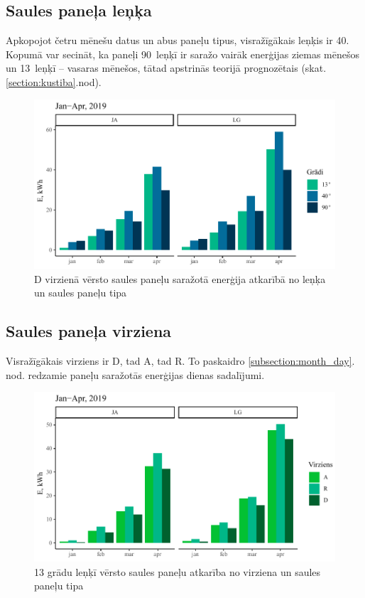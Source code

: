 \subsection{Saules paneļa leņķa}\label{subsection:degree}
Apkopojot četru mēnešu datus un abus paneļu tipus, visražīgākais leņķis ir 40\textdegree.
Kopumā var secināt, ka paneļi 90\textdegree ~leņķī ir saražo vairāk enerģijas ziemas mēnešos un 13\textdegree ~leņķī -- vasaras mēnešos, tātad apstrinās teorijā prognozētais (skat.\ref{section:kustiba}.nod).
\begin{figure}[h]
    \centering
    \includegraphics[width=\linewidth]{figures/results/all_degType.pdf}
    \caption{D virzienā vērsto saules paneļu saražotā enerģija atkarībā no leņķa un saules paneļu tipa} \label{fig:lg_ja_deg}
\end{figure}


\subsection{Saules paneļa virziena}\label{subsection:dir}
Visražīgākais virziens ir D, tad A, tad R. To paskaidro \ref{subsection:month_day}. nod. redzamie paneļu saražotās enerģijas dienas sadalījumi.
\begin{figure}[h]
    \centering
    \includegraphics[width=\linewidth]{figures/results/all_dirType.pdf}
    \caption{13 grādu leņķī vērsto saules paneļu atkarība no virziena un saules paneļu tipa}
    \label{fig:lg_ja_dir}
\end{figure}

